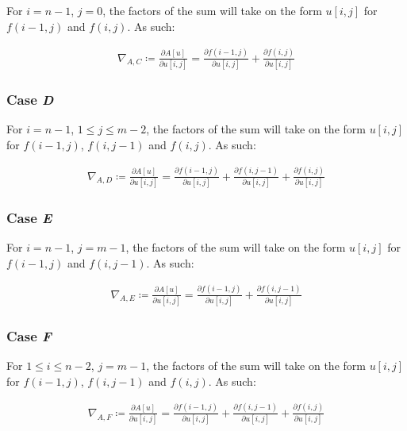 \documentclass[a4paper]{scrreprt}
\begin{document}
For $i = n - 1$, $j = 0$, the factors of the sum will take on the form $u[i,
j]$ for $f(i - 1, j)$ and $f(i, j)$. As such:

\begin{align*}
		\nabla_{A, C} \coloneqq \frac{\partial A[u]}{\partial u[i, j]} = 
		  \frac{\partial f(i - 1, j)}{\partial u[i, j]} 
		  + \frac{\partial f(i, j)}{\partial u[i, j]}
\end{align*}

\subsubsection{Case \emph{D}}

For $i = n - 1$, $1 \leq j \leq m - 2$, the factors of the sum will take on the
form $u[i, j]$ for $f(i - 1, j)$, $f(i, j - 1)$ and $f(i, j)$. As such:

\begin{align*}
		\nabla_{A, D} \coloneqq \frac{\partial A[u]}{\partial u[i, j]} = 
		  \frac{\partial f(i - 1, j)}{\partial u[i, j]} 
		  + \frac{\partial f(i, j - 1)}{\partial u[i, j]} 
		  + \frac{\partial f(i, j)}{\partial u[i, j]}
\end{align*}

\subsubsection{Case \emph{E}}

For $i = n - 1$, $j = m - 1$, the factors of the sum will take on the form
$u[i, j]$ for $f(i - 1, j)$ and $f(i, j - 1)$. As such:

\begin{align*}
		\nabla_{A, E} \coloneqq \frac{\partial A[u]}{\partial u[i, j]} = 
		  \frac{\partial f(i - 1, j)}{\partial u[i, j]}
		  + \frac{\partial f(i, j - 1)}{\partial u[i, j]}
\end{align*}

\subsubsection{Case \emph{F}}

For $1 \leq i \leq n - 2$, $j = m - 1$, the factors of the sum will take on the
form $u[i, j]$ for $f(i - 1, j)$, $f(i, j - 1)$ and $f(i, j)$. As such:

\begin{align*}
		\nabla_{A, F} \coloneqq \frac{\partial A[u]}{\partial u[i, j]} = 
		  \frac{\partial f(i - 1, j)}{\partial u[i, j]}
		  + \frac{\partial f(i, j - 1)}{\partial u[i, j]}
		  + \frac{\partial f(i, j)}{\partial u[i, j]}
\end{align*}
\end{document}
